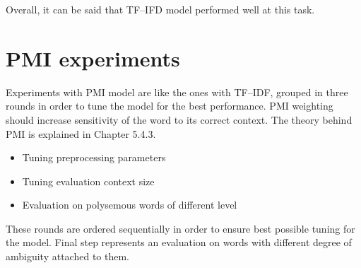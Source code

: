 Overall, it can be said that TF--IFD model performed well at this task. 

\newpage
\section{PMI experiments} 
Experiments with PMI model are like the ones with TF--IDF, grouped in three rounds in order to tune
the model for the best performance. PMI weighting should increase sensitivity of the word to its correct context. 
The theory behind PMI is explained in Chapter 5.4.3.
\begin{itemize}
\item Tuning preprocessing parameters
\item Tuning evaluation context size
\item Evaluation on polysemous words of different level
\end{itemize}
These rounds are ordered sequentially in order to ensure best possible tuning for the model. Final step
represents an evaluation on words with different degree of ambiguity attached to them.


